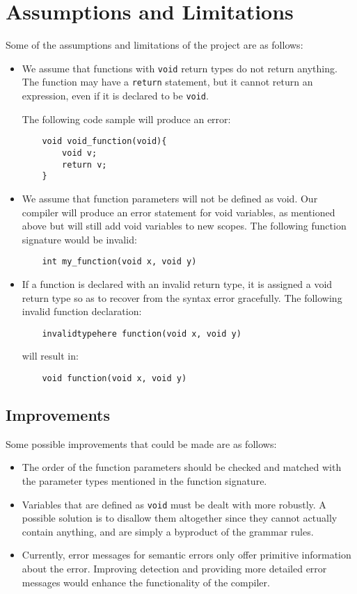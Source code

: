 \documentclass[12pt, letterpaper]{article}
\begin{document}
\section{Assumptions and Limitations}
Some of the assumptions and limitations of the project are as follows:
\begin{itemize}
\item We assume that functions with \texttt{void} return types do not return anything. The function may have a \texttt{return} statement, but it cannot return an expression, even if it is declared to be \texttt{void}. 

The following code sample will produce an error:
\begin{lstlisting}
	void void_function(void){
		void v;
		return v;
	}
\end{lstlisting}

\item We assume that function parameters will not be defined as void. Our compiler will produce an error statement for void variables, as mentioned above but will still add void variables to new scopes. The following function signature would be invalid:
\begin{lstlisting}
	int my_function(void x, void y)
\end{lstlisting}

\item If a function is declared with an invalid return type, it is assigned a void return type so as to recover from the syntax error gracefully. The following invalid function declaration: 
\begin{lstlisting}
	invalidtypehere function(void x, void y)
\end{lstlisting}

will result in:
\begin{lstlisting}
	void function(void x, void y)
\end{lstlisting}

\end{itemize}

\subsection{Improvements}
Some possible improvements that could be made are as follows:
\begin{itemize}
\item The order of the function parameters should be checked and matched with the parameter types mentioned in the function signature.
\item Variables that are defined as \texttt{void} must be dealt with more robustly. A possible solution is to disallow them altogether since they cannot actually contain anything, and are simply a byproduct of the grammar rules.
\item Currently, error messages for semantic errors only offer primitive information about the error. Improving detection and providing more detailed error messages would enhance the functionality of the compiler.
\end{itemize}
\end{document}
